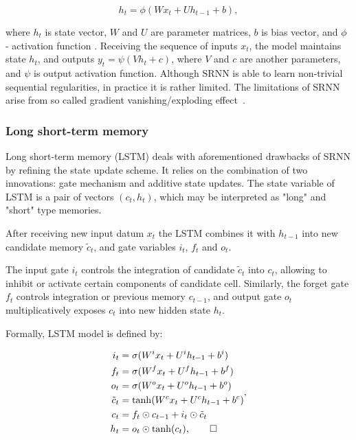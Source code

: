 \documentclass[a4paper,11pt]{article}
\begin{document}
\begin{equation}
\label{eq:SRNN}
h_{t} = \phi(Wx_{t} + Uh_{t-1} + b),
\end{equation}

\noindent where $h_{t}$ is state vector, $W$ and $U$ are parameter matrices, $b$ is bias vector, and $\phi$ - activation function \cite{Elman}. 
Receiving the sequence of inputs $x_{t}$, the model maintains  state $h_{t}$, and 
outputs $y_{t} = \psi(Vh_{t} + c)$, where $V$ and $c$ are another parameters, and $\psi$ is output activation function. Although SRNN is able to learn non-trivial sequential regularities, in practice it is rather limited. The limitations of SRNN arise from so called gradient vanishing/exploding effect~\cite{Bengio}.



\subsubsection{Long short-term memory}


Long short-term memory (LSTM) \cite{Hochreiter} deals with aforementioned drawbacks of SRNN by refining the state update scheme. It relies on the combination of two innovations: gate mechanism and additive state updates. The state  variable of LSTM is a pair of vectors $(c_{t}, h_{t})$, which may be interpreted as "long" and "short" type memories. %


After receiving new input datum $x_{t}$ the LSTM combines it with $h_{t-1}$ into new candidate memory $
\tilde{c}_{t}$, and gate variables $i_{t}$, $f_{t}$ and $o_{t}$. 

The input gate $i_{t}$ controls the integration of candidate $\tilde{c}_{t}$ into $c_{t}$, allowing to 
inhibit or activate certain components of candidate cell. Similarly, the forget gate $f_{t}$ controls integration or previous memory $c_{t-1}$, 
and output gate $o_{t}$ multiplicatively exposes $c_{t}$ into new hidden state $h_{t}$.

Formally, LSTM model is defined by:

\begin{align}
\begin{split}
\label{LSTM}
i_{t} &=\sigma(W^{i}x_{t} + U^{i}h_{t-1} + b^{i})\\
f_{t} &=\sigma(W^{f}x_{t} + U^{f}h_{t-1} + b^{f})\\
o_{t} &=\sigma(W^{o}x_{t} + U^{o}h_{t-1} + b^{o})\\
\tilde{c}_{t} &= \tanh(W^{c}x_{t} + U^{c}h_{t-1} + b^{c})\\
c_{t} &=f_{t} \odot c_{t-1} + i_{t} \odot \tilde{c}_{t}\\
h_{t} &=o_{t} \odot \tanh(c_{t}), \qedhere
\end{split},
\end{align}
\end{document}

